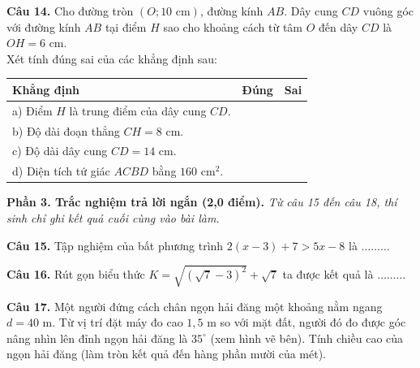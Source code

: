 \documentclass[11pt,a4paper]{article}
\begin{document}
\vspace{2mm}
\textbf{Câu 14.} Cho đường tròn $(O; 10\text{ cm})$, đường kính $AB$. Dây cung $CD$ vuông góc với đường kính $AB$ tại điểm $H$ sao cho khoảng cách từ tâm $O$ đến dây $CD$ là $OH = 6\text{ cm}$.\\
Xét tính đúng sai của các khẳng định sau:
\begin{center}
\begin{tabularx}{\linewidth}{|X|c|c|}
\hline
\textbf{Khẳng định} & \textbf{Đúng} & \textbf{Sai} \\
\hline
a) Điểm $H$ là trung điểm của dây cung $CD$. & & \\
\hline
b) Độ dài đoạn thẳng $CH = 8\text{ cm}$. & & \\
\hline
c) Độ dài dây cung $CD = 14\text{ cm}$. & & \\
\hline
d) Diện tích tứ giác $ACBD$ bằng $160\text{ cm}^2$. & & \\
\hline
\end{tabularx}
\end{center}

\vspace{3mm}
\noindent
\textbf{Phần 3. Trắc nghiệm trả lời ngắn (2,0 điểm).} \textit{Từ câu 15 đến câu 18, thí sinh chỉ ghi kết quả cuối cùng vào bài làm.}

\vspace{1.5mm}
\textbf{Câu 15.} Tập nghiệm của bất phương trình $2(x - 3) + 7 > 5x - 8$ là $\dots\dots\dots$

\vspace{1.5mm}
\textbf{Câu 16.} Rút gọn biểu thức $K = \sqrt{(\sqrt{7} - 3)^2} + \sqrt{7}$ ta được kết quả là $\dots\dots\dots$

\vspace{1.5mm}
\noindent
\begin{minipage}[c]{0.65\linewidth}
\textbf{Câu 17.} Một người đứng cách chân ngọn hải đăng một khoảng nằm ngang $d = 40\text{ m}$. Từ vị trí đặt máy đo cao $1{,}5\text{ m}$ so với mặt đất, người đó đo được góc nâng nhìn lên đỉnh ngọn hải đăng là $35^\circ$ (xem hình vẽ bên). Tính chiều cao của ngọn hải đăng (làm tròn kết quả đến hàng phần mười của mét).
\end{minipage}\hfill
\begin{minipage}[c]{0.32\linewidth}
\centering
{}
\end{minipage}
\end{document}
